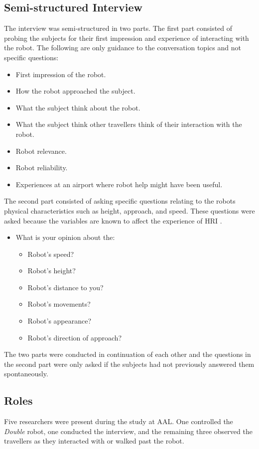 \subsection{Semi-structured Interview}
The interview was semi-structured in two parts. The first part consisted of probing the subjects for their first impression and experience of interacting with the robot. The following are only guidance to the conversation topics and not specific questions:\\ 
%
\begin{itemize}
\item First impression of the robot.
\item How the robot approached the subject.
\item What the subject think about the robot.
\item What the subject think other travellers think of their interaction with the robot.
\item Robot relevance.
\item Robot reliability.
\item Experiences at an airport where robot help might have been useful.\\
\end{itemize}
\noindent
%
The second part consisted of asking specific questions relating to the robots physical characteristics such as height, approach, and speed. These questions were asked because the variables are known to affect the experience of HRI \cite{PDF:HowMayIServeYou}.\\
%
\begin{itemize}
\item What is your opinion about the:
	\begin{itemize}
		\item Robot's speed?
		\item Robot's height?
		\item Robot's distance to you?
		\item Robot's movements?
		\item Robot's appearance?
		\item Robot's direction of approach? \\
	\end{itemize}
\end{itemize}
%
The two parts were conducted in continuation of each other and the questions in the second part were only asked if the subjects had not previously answered them spontaneously.
 
\subsection{Roles}
Five researchers were present during the study at AAL. One controlled the \textit{Double} robot, one conducted the interview, and the remaining three observed the travellers as they interacted with or walked past the robot. 

